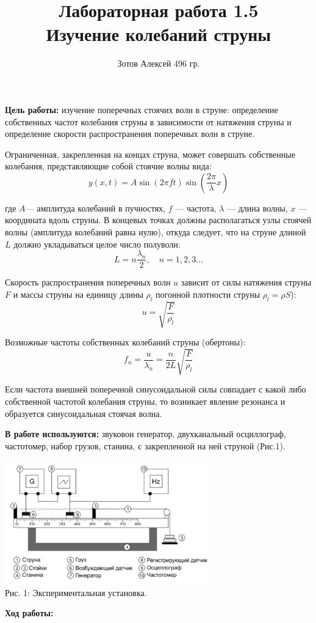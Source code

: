 \documentclass[8pt]{article}
\begin{document}
    \author {Зотов Алексей 496 гр.}
    \title {Лабораторная работа 1.5 \\  Изучение колебаний струны}
    \maketitle{}   

    \textbf{Цель работы:} изучение поперечных стоячих волн в струне: определение собственных частот колебания струны в зависимости от натяжения струны и определение скорости распространения поперечных волн в струне. 

    Ограниченная, закрепленная на концах струна, может совершать собственные колебания, представляющие собой стоячие волны вида:
    \begin{equation}
        y(x,t) = A\sin \left (2 \pi f t \right )\sin \left(\frac{2\pi}{\lambda}x \right)
    \end{equation}

    где $A$— амплитуда колебаний в пучностях, $f$ — частота, $\lambda$ — длина волны, $x$ — координата вдоль струны. В концевых точках должны располагаться узлы стоячей волны (амплитуда колебаний равна нулю), откуда следует, что на струне длиной $L$ должно укладываться целое число полуволн:
    \begin{equation}
        L = n \frac{\lambda_n}{2}, \quad n = 1,2,3\dots        
    \end{equation}

    Скорость распространения поперечных волн $u$ зависит от силы натяжения струны $F$ и массы струны на единицу длины 
    $\rho _l$ погонной плотности струны $\rho _l  = \rho S$):
    \begin{equation}
        u = \sqrt{\frac{F}{\rho_l}}
    \end{equation}

    Возможные частоты собственных колебаний струны (обертоны):
    \begin{equation}
        f_n = \frac{u}{\lambda_n} = \frac{n}{2L}\sqrt{\frac{F}{\rho_l}} 
    \end{equation}

    Если частота внешней поперечной синусоидальной силы совпадает с какой либо собственной частотой колебания струны, то возникает явление резонанса и образуется синусоидальная стоячая волна.

    \textbf{В работе используются:} звуковои генератор, двухканальный осциллограф, частотомер, набор грузов, станина, с закрепленной на ней струной (Рис.1).

    \begin{center} 
        \includegraphics[width=3.5in]{string_img.png} \\ Рис. 1: Экспериментальная установка.
    \end{center}
    
    \textbf{Ход работы:}\\
    
\end{document}
